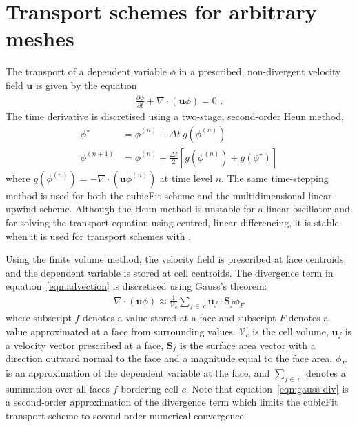 \section{Transport schemes for arbitrary meshes}
\label{sec:transport}
The transport of a dependent variable $\phi$ in a prescribed, non-divergent velocity field $\mathbf{u}$ is given by the equation		
\begin{align}		
	\frac{\partial \phi}{\partial t} + \nabla \cdot \left( \mathbf{u} \phi \right) = 0 \text{ .} \label{eqn:advection}		
\end{align}
The time derivative is discretised using a two-stage, second-order Heun method,
\begin{subequations}
\begin{align}
	\phi^\star &= \phi^{(n)} + \Delta t \: g(\phi^{(n)}) \\
	\phi^{(n+1)} &= \phi^{(n)} + \frac{\Delta t}{2} \left[ g(\phi^{(n)}) + g(\phi^{\star}) \right]
\end{align} \label{eqn:heun}
\end{subequations}
where \(g(\phi^{(n)}) = - \nabla \cdot (\mathbf{u} \phi^{(n)})\) at time level \(n\).  The same time-stepping method is used for both the cubicFit scheme and the multidimensional linear upwind scheme.
Although the Heun method is unstable for a linear oscillator \citep{durran2013} and for solving the transport equation using centred, linear differencing, it is stable when it is used for transport schemes with .

Using the finite volume method, the velocity field is prescribed at face centroids and the dependent variable is stored at cell centroids.  The divergence term in equation~\eqref{eqn:advection} is discretised using Gauss's theorem:
\begin{align}
	\nabla \cdot \left( \mathbf{u} \phi \right) \approx \frac{1}{\mathcal{V}_c} \sum_{f \in\:c} \mathbf{u}_f \cdot \mathbf{S}_f \phi_F \label{eqn:gauss-div}
\end{align}
where subscript $f$ denotes a value stored at a face and subscript $F$ denotes a value approximated at a face from surrounding values.  $\mathcal{V}_c$ is the cell volume, $\mathbf{u}_f$ is a velocity vector prescribed at a face, ${\mathbf{S}_f}$ is the surface area vector with a direction outward normal to the face and a magnitude equal to the face area, $\phi_F$ is an approximation of the dependent variable at the face, and $\sum_{f \in\:c}$ denotes a summation over all faces $f$ bordering cell $c$.
Note that equation~\eqref{eqn:gauss-div} is a second-order approximation of the divergence term which limits the cubicFit transport scheme to second-order numerical convergence.

